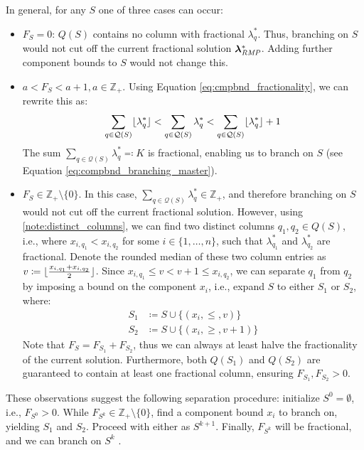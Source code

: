 In general, for any $S$ one of three cases can occur:
\begin{itemize}
\item	$F_S = 0$: $Q(S)$ contains no column with fractional $\lambda_q^*$. Thus, branching on $S$ would not cut off the current fractional solution ${\bm{\lambda}}^*_{\textit{RMP}}{}$. Adding further component bounds to $S$ would not change this.
\item	$a < F_S < a + 1, a \in \mathbb{Z}_+$. Using Equation \eqref{eq:cmpbnd_fractionality}, we can rewrite this as:
		\begin{equation}
		\sum_{q \in \mathcal{Q}(S)} \lfloor\lambda_q^*\rfloor < \sum_{q \in \mathcal{Q}(S)} \lambda_q^* < \sum_{q \in \mathcal{Q}(S)} \lfloor\lambda_q^*\rfloor + 1
		\end{equation}
		The sum $\sum_{q \in \mathcal{Q}(S)} \lambda_q^* \eqcolon K$ is fractional, enabling us to branch on $S$ (see Equation \eqref{eq:compbnd_branching_master}).
\item	$F_S \in \mathbb{Z}_+ \setminus \{0\}$. In this case, $\sum_{q \in \mathcal{Q}(S)} \lambda_q^* \in \mathbb{Z}_+$, and therefore branching on $S$ would not cut off the current fractional solution. However, using \ref{note:distinct_columns}, we can find two distinct columns $q_1, q_2 \in Q(S)$, i.e., where $x_{i,q_1} < x_{i,q_2}$ for some $i \in \{1, \dots, n\}$, such that $\lambda_{q_1}^*$ and $\lambda_{q_2}^*$ are fractional. Denote the rounded median of these two column entries as $v \coloneqq \lfloor\frac{x_{i,q_1} + x_{i,q_2}}{2}\rfloor$. Since $x_{i,q_1} \leq v < v + 1 \leq x_{i,q_2}$, we can separate $q_1$ from $q_2$ by imposing a bound on the component $x_i$, i.e., expand $S$ to either $S_1$ or $S_2$, where:
		\begin{equation}
		\begin{aligned}
		S_1 &\coloneqq S \cup \{\left( x_i, \leq, v \right)\}\\
		S_2 &\coloneqq S \cup \{\left( x_i, \geq, v + 1 \right)\}
		\end{aligned}
		\end{equation}
		Note that $F_S = F_{S_1} + F_{S_2}$, thus we can always at least halve the fractionality of the current solution. Furthermore, both $Q(S_1)$ and $Q(S_2)$ are guaranteed to contain at least one fractional column, ensuring $F_{S_1}, F_{S_2} > 0$.
\end{itemize}

These observations suggest the following separation procedure: initialize $S^0 = \emptyset$, i.e., $F_{S^0} > 0$. While $F_{S^k} \in \mathbb{Z}_+ \setminus \{0\}$, find a component bound $x_i$ to branch on, yielding $S_1$ and $S_2$. Proceed with either as $S^{k+1}$. Finally, $F_{S^k}$ will be fractional, and we can branch on $S^k$ \cite{thebook}.


